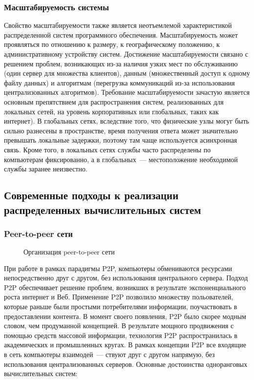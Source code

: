 \subsubsection{Масштабируемость системы}
Свойство масштабируемости также является неотъемлемой характеристикой распределенной систем программного обеспечения. Масштабируемость может проявляться по отношению к размеру, к географическому положению, к административному устройству систем. Достижение масштабируемости связано с решением проблем, возникающих из-за наличия узких мест по обслуживанию (один сервер для множества клиентов), данным (множественный доступ к одному файлу данных) и алгоритмам (перегрузка коммуникаций из-за использования централизованных алгоритмов). Требование масштабируемости зачастую является основным препятствием для распространения систем, реализованных для локальных сетей, на уровень корпоративных или глобальных, таких как интернет). В глобальных сетях, вследствие того, что физические узлы могуг быть сильно разнесены в пространстве, время получения ответа может значительно превышать локальные задержки, поэтому там чаще используется асинхронная связь. Кроме того, в локальных сетях службы часто распределены по компьютерам фиксированно, а в глобальных~--- местоположение необходимой службы заранее неизвестно.

\subsection{Современные подходы к реализации распределенных вычислительных систем}
\subsubsection{Peer-to-peer сети}
\begin{figure}[h]
\caption{Организация peer-to-peer сети}
\label{0:peer}
\end{figure}

При работе в рамках парадигмы P2P, компьютеры обмениваются ресурсами непосредственно друг с другом, без использования центрального сервера. Подход P2P обеспечивает решение проблем, возникших в результате экспоненциального роста интернет и Веб. Применение P2P позволило множеству польователей, которые раньше были простыми потребителями информации, поучаствовать в предоставлении контента. В момент своего появления, P2P было скорее модным словом, чем продуманной концепцией. В результате мощного продвижения с помощью средств массовой информации, технология P2P распространилась в академических и промышленных кругах. В рамках концепции P2P все входящие в сеть компьютеры взаимодей~--- ствуют друг с другом напрямую, без использования централизованных серверов. Основные достоинства одноранговых вычислительных систем:

